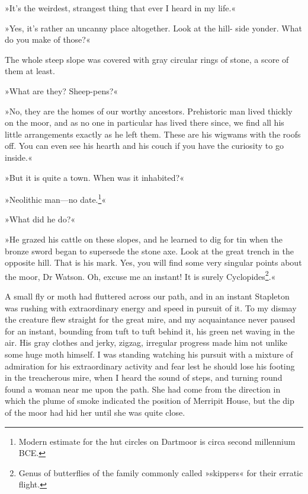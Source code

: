 »It's the weirdest, strangest thing that ever I heard in my life.«

»Yes, it's rather an uncanny place altogether. Look at the hill- side yonder. What do you make of those?«

The whole steep slope was covered with gray circular rings of stone, a score of them at least.

»What are they? Sheep-pens?«

»No, they are the homes of our worthy ancestors. Prehistoric man lived thickly on the moor, and as no one in particular has lived there since, we find all his little arrangements exactly as he left them. These are his wigwams with the roofs off. You can even see his hearth and his couch if you have the curiosity to go inside.«

»But it is quite a town. When was it inhabited?«

»Neolithic man—no date.\footnote{Modern estimate for the hut circles on Dartmoor is circa second millennium BCE.}«

»What did he do?«

»He grazed his cattle on these slopes, and he learned to dig for tin when the bronze sword began to supersede the stone axe. Look at the great trench in the opposite hill. That is his mark. Yes, you will find some very singular points about the moor, Dr Watson. Oh, excuse me an instant! It is surely Cyclopides\footnote{Genus of butterflies of the family commonly called »skippers« for their erratic flight.}.«

A small fly or moth had fluttered across our path, and in an instant Stapleton was rushing with extraordinary energy and speed in pursuit of it. To my dismay the creature flew straight for the great mire, and my acquaintance never paused for an instant, bounding from tuft to tuft behind it, his green net waving in the air. His gray clothes and jerky, zigzag, irregular progress made him not unlike some huge moth himself. I was standing watching his pursuit with a mixture of admiration for his extraordinary activity and fear lest he should lose his footing in the treacherous mire, when I heard the sound of steps, and turning round found a woman near me upon the path. She had come from the direction in which the plume of smoke indicated the position of Merripit House, but the dip of the moor had hid her until she was quite close.

